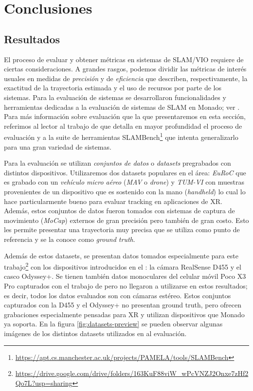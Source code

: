 \documentclass[ twoside,openright,titlepage,numbers=noenddot,%
                headinclude,footinclude,cleardoublepage=empty,abstract=on,
                BCOR=-5mm,paper=a4,fontsize=11pt
                ]{scrreprt}
\newcommand{\figref}{\autoref}
\begin{document}
\hypertarget{conclusiones}{%
\part{Conclusiones}\label{conclusiones}}

\hypertarget{evaluation}{%
\chapter{Resultados}\label{evaluation}}

El proceso de evaluar y obtener métricas en sistemas de SLAM/VIO
requiere de ciertas consideraciones. A grandes rasgos, podemos dividir
las métricas de interés usuales en medidas de \emph{precisión} y de
\emph{eficiencia} que describen, respectivamente, la exactitud de la
trayectoria estimada y el uso de recursos por parte de los sistemas.
Para la evaluación de sistemas se desarrollaron funcionalidades y
herramientas dedicadas a la evaluación de sistemas de SLAM en Monado;
ver
.
Para más información sobre evaluación que la que presentaremos en esta
sección, referimos al lector al trabajo de
\textcite{kummerleMeasuringAccuracySLAM2009} que detalla en mayor
profundidad el proceso de evaluación y a la suite de herramientas
SLAMBench\footnote{\url{https://apt.cs.manchester.ac.uk/projects/PAMELA/tools/SLAMBench}}
\autocite{nardiIntroducingSLAMBenchPerformance2015} que intenta
generalizarlo para una gran variedad de sistemas.

Para la evaluación se utilizan \emph{conjuntos de datos} o
\emph{datasets} pregrabados con distintos dispositivos. Utilizaremos dos
datasets populares en el área: \emph{EuRoC}
\autocite{burriEuRoCMicroAerial2016} que es grabado con un
\emph{vehículo micro aéreo} (\emph{MAV} o \emph{drone}) y \emph{TUM-VI}
\autocite{schubertBasaltTUMVI2018} con muestras provenientes de un
dispositivo que es sostenido con la mano (\emph{handheld}) lo cual lo
hace particularmente bueno para evaluar tracking en aplicaciones de XR.
Además, estos conjuntos de datos fueron tomados con sistemas de captura
de movimiento (\emph{MoCap}) externos de gran precisión pero también de
gran costo. Esto les permite presentar una trayectoria muy precisa que
se utiliza como punto de referencia y se la conoce como \emph{ground
truth}.

Además de estos datasets, se presentan datos tomados especialmente para
este trabajo\footnote{\url{https://drive.google.com/drive/folders/163KuF88viW_wPcVNZJ2Onxe7zHf2Qo7L?usp=sharing}}
con los dispositivos introducidos en el : la cámara
RealSense D455 y el casco Odyssey+. Se tienen también datos monoculares
del celular móvil Poco X3 Pro capturados con el trabajo de
\textcite{huaiMobileARSensor2019} pero no llegaron a utilizarse en estos
resultados; es decir, todos los datos evaluados son con cámaras estéreo.
Estos conjuntos capturados con la D455 y el Odyssey+ no presentan ground
truth, pero ofrecen grabaciones especialmente pensadas para XR y
utilizan dispositivos que Monado ya soporta. En la figura
\figref{fig:datasets-preview} se pueden observar algunas imágenes de los
distintos datasets utilizados en al evaluación.
\end{document}
